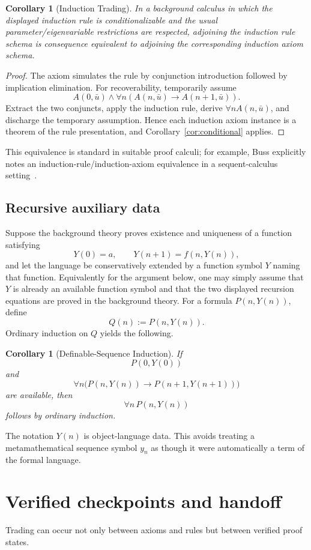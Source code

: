 \documentclass[11pt]{article}
\newtheorem{corollary}[theorem]{Corollary}
\theoremstyle{definition}
\theoremstyle{remark}
\begin{document}
\begin{corollary}[Induction Trading]\label{cor:induction}
In a background calculus in which the displayed induction rule is conditionalizable and the usual parameter/eigenvariable restrictions are respected, adjoining the induction rule schema is consequence equivalent to adjoining the corresponding induction axiom schema.
\end{corollary}

\begin{proof}
The axiom simulates the rule by conjunction introduction followed by implication elimination. For recoverability, temporarily assume
\[
A(0,\bar u)\land\forall n(A(n,\bar u)\to A(n+1,\bar u)).
\]
Extract the two conjuncts, apply the induction rule, derive $\forall nA(n,\bar u)$, and discharge the temporary assumption. Hence each induction axiom instance is a theorem of the rule presentation, and Corollary~\ref{cor:conditional} applies.
\end{proof}

This equivalence is standard in suitable proof calculi; for example, Buss explicitly notes an induction-rule/induction-axiom equivalence in a sequent-calculus setting~\cite{Buss1998}.

\subsection{Recursive auxiliary data}
Suppose the background theory proves existence and uniqueness of a function satisfying
\[
Y(0)=a,\qquad Y(n+1)=f(n,Y(n)),
\]
and let the language be conservatively extended by a function symbol $Y$ naming that function. Equivalently for the argument below, one may simply assume that $Y$ is already an available function symbol and that the two displayed recursion equations are proved in the background theory. For a formula $P(n,Y(n))$, define
\[
Q(n):=P(n,Y(n)).
\]
Ordinary induction on $Q$ yields the following.

\begin{corollary}[Definable-Sequence Induction]
If
\[
P(0,Y(0))
\]
and
\[
\forall n\bigl(P(n,Y(n))\to P(n+1,Y(n+1))\bigr)
\]
are available, then
\[
\forall n\,P(n,Y(n))
\]
follows by ordinary induction.
\end{corollary}

The notation $Y(n)$ is object-language data. This avoids treating a metamathematical sequence symbol $y_n$ as though it were automatically a term of the formal language.

\section{Verified checkpoints and handoff}
Trading can occur not only between axioms and rules but between verified proof states.
\end{document}
